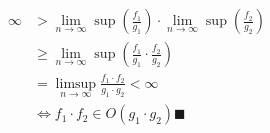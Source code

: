 \documentclass{article}
\begin{document}
    \begin{align*}
        \infty &> \lim\limits_{n\rightarrow\infty}\sup(\frac{f_1}{g_1}) \cdot
        \lim\limits_{n\rightarrow\infty}\sup(\frac{f_2}{g_2})\\
        &\geq \lim\limits_{n\rightarrow\infty}\sup(\frac{f_1}{g_1}\cdot \frac{f_2}{g_2})\\
        &=\limsup\limits_{n\rightarrow\infty}\frac{f_1\cdot f_2}{g_1 \cdot g_2} < \infty\\
        &\Leftrightarrow f_1\cdot f_2\in O(g_1\cdot g_2) \blacksquare
    \end{align*}
\end{document}
